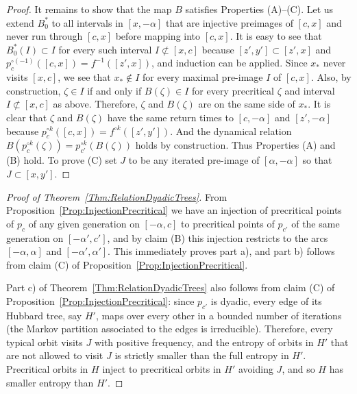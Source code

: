 \documentclass[12pt]{amsart}
\newcommand{\0}{\texttt{0}}
\newcommand{\1}{\texttt{1}}
\theoremstyle{definition}
\numberwithin{equation}{section}
\begin{document}
\begin{proof}
It remains to show that the map $B$ satisfies Properties (A)--(C). Let us extend $B_0^*$ to all intervals in $[x,-\alpha]$ that are injective preimages of $[c,x]$ and never run through $[c,x]$ before mapping into $[c,x]$. It is easy to see that $B_0^*(I)\subset I$ for every such interval $I\not \subset [x,c]$ because $[z',y']\subset [z',x]$ and $p_c^{\circ (-1)}([c,x])=f^{-1}([z',x])$, and induction can be applied. Since $x_*$ never visits $[x,c]$, we see that  $x_*\not \in I$ for every maximal pre-image $I$ of $[c,x]$. Also, by construction, $\zeta \in I$ if and only if $B(\zeta)\in I$ for every precritical $\zeta$ and interval $I\not \subset [x,c]$ as above. Therefore, $\zeta$ and $B(\zeta)$ are on the same side of $x_*$. It is clear that $\zeta$ and $B(\zeta)$ have the same return times to $[c,-\alpha]$ and $[z',-\alpha]$ because $p_c^{\circ k}([c,x])=f^{\circ k}([z',y'])$. And the dynamical relation $B(p_c^{\circ k}(\zeta))=p_{c'}^{\circ k}(B(\zeta))$ holds by construction. Thus Properties (A) and (B) hold. To prove (C) set $J$ to be any {iterated} pre-image of $[\alpha,-\alpha]$ so that $J\subset [x,y']$.
\end{proof}


\begin{proof}[Proof of Theorem~\ref{Thm:RelationDyadicTrees}]
From Proposition~\ref{Prop:InjectionPrecritical} we have an injection of precritical points of $p_{c}$ of any given generation on $[-\alpha,c]$ to precritical points of $p_{c'}$ of the same generation on $[-\alpha',c']$, and by claim (B) this injection restricts to the arcs $[-\alpha,\alpha]$ and $[-\alpha',\alpha']$. This immediately proves part a), and part b) follows from claim (C) of Proposition~\ref{Prop:InjectionPrecritical}.

Part c) of Theorem~\ref{Thm:RelationDyadicTrees} also follows from claim (C) of Proposition~\ref{Prop:InjectionPrecritical}:  since $p_{c'}$ is dyadic, every edge of its Hubbard tree, say $H'$, maps over every other in a bounded number of iterations (the Markov partition associated to the edges is irreducible). Therefore, every typical orbit visits $J$ with positive frequency, and the entropy of orbits in $H'$ that are not allowed to visit $J$ is strictly smaller than the full entropy in $H'$. Precritical orbits in $H$ inject to precritical orbits in $H'$ avoiding $J$, and so $H$ has smaller entropy than $H'$.
\end{proof}



\end{document}
